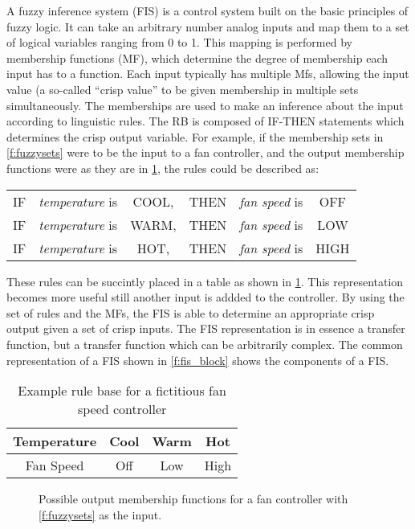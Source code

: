 A fuzzy inference system (FIS) is a control system built on the basic principles of fuzzy
logic\cite{kosko:91bk}\cite{kosko:93sciam}. It can take an arbitrary number analog inputs and map them to a
set of logical variables ranging from 0 to 1. This mapping is performed by membership functions (MF), which
determine the degree of membership each input has to a function. Each input typically has multiple Mfs,
allowing the input value (a so-called ``crisp value'' to be given membership in multiple sets
simultaneously. The memberships are used to make an inference about the input according to linguistic rules.
The RB is composed of IF-THEN statements which determines the crisp output variable. For example, if the
membership sets in \cref{f:fuzzysets} were to be the input to a fan controller, and the output membership
functions were as they are in \cref{f:outputfan}, the rules could be described as:

\vspace{2em}
\begin{tabular}{cccccc}
        IF &  \emph{temperature} is & COOL, & THEN & \emph{fan speed} is & OFF\\
        IF &  \emph{temperature} is & WARM, & THEN & \emph{fan speed} is & LOW\\
        IF &  \emph{temperature} is & HOT,  & THEN & \emph{fan speed} is & HIGH
\end{tabular}
\vspace{2em}

These rules can be succintly placed in a table as shown in \cref{t:fanspeed}. This representation becomes more
useful still another input is addded to the controller. By using the set of rules and the MFs, the FIS is able
to determine an appropriate crisp output given a set of crisp inputs. The FIS representation is in essence a
transfer function, but a transfer function which can be arbitrarily complex. The common representation of a
FIS shown in \cref{f:fis_block} shows the components of a FIS.

\begin{table}[ht]
    \centering
    \caption{Example rule base for a fictitious fan speed controller}\label{t:fanspeed}
    \begin{tabular}{c|c|c|c}
        Temperature & Cool & Warm & Hot\\\hline
        Fan Speed & Off & Low & High
    \end{tabular}
\end{table}

\begin{figure}[ht]
    \centering
    
    \caption{Possible output membership functions for a fan controller with \cref{f:fuzzysets} as the
    input.}\label{f:outputfan}
\end{figure}


